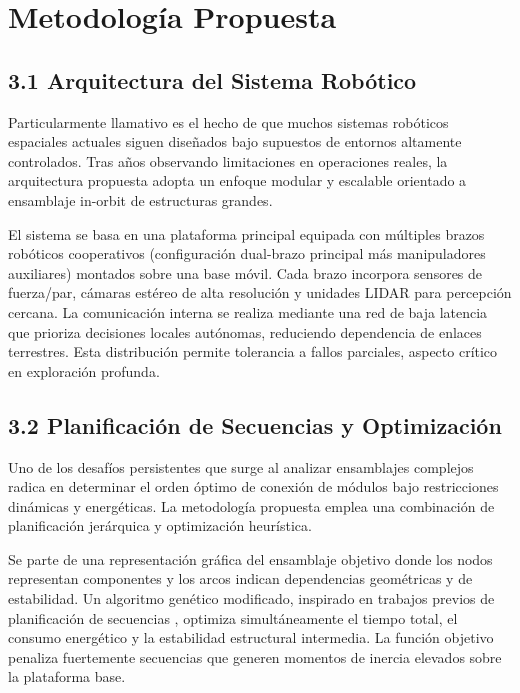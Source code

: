 \section{Metodología Propuesta}

\subsection{3.1 Arquitectura del Sistema Robótico}

Particularmente llamativo es el hecho de que muchos sistemas robóticos espaciales actuales siguen diseñados bajo supuestos de entornos altamente controlados. Tras años observando limitaciones en operaciones reales, la arquitectura propuesta adopta un enfoque modular y escalable orientado a ensamblaje in-orbit de estructuras grandes.

El sistema se basa en una plataforma principal equipada con múltiples brazos robóticos cooperativos (configuración dual-brazo principal más manipuladores auxiliares) montados sobre una base móvil. Cada brazo incorpora sensores de fuerza/par, cámaras estéreo de alta resolución y unidades LIDAR para percepción cercana. La comunicación interna se realiza mediante una red de baja latencia que prioriza decisiones locales autónomas, reduciendo dependencia de enlaces terrestres. Esta distribución permite tolerancia a fallos parciales, aspecto crítico en exploración profunda.

\subsection{3.2 Planificación de Secuencias y Optimización}

Uno de los desafíos persistentes que surge al analizar ensamblajes complejos radica en determinar el orden óptimo de conexión de módulos bajo restricciones dinámicas y energéticas. La metodología propuesta emplea una combinación de planificación jerárquica y optimización heurística.

Se parte de una representación gráfica del ensamblaje objetivo donde los nodos representan componentes y los arcos indican dependencias geométricas y de estabilidad. Un algoritmo genético modificado, inspirado en trabajos previos de planificación de secuencias \cite{Timmermann2024_Assembly}, optimiza simultáneamente el tiempo total, el consumo energético y la estabilidad estructural intermedia. La función objetivo penaliza fuertemente secuencias que generen momentos de inercia elevados sobre la plataforma base.

